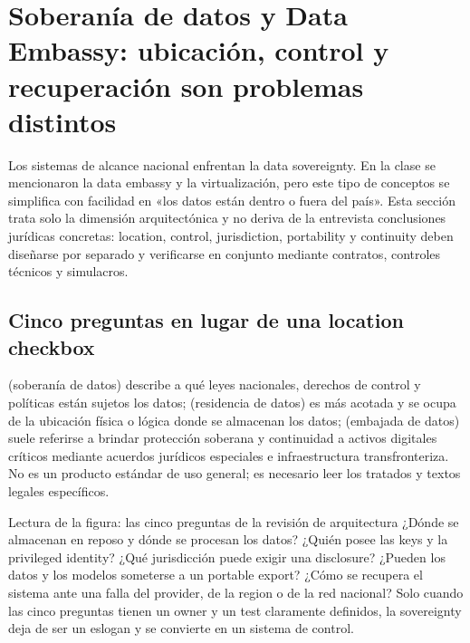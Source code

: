 \section{Soberanía de datos y Data Embassy: ubicación, control y recuperación son problemas distintos}

Los sistemas de alcance nacional enfrentan la data sovereignty. En la clase se mencionaron la data embassy y la virtualización, pero este tipo de conceptos se simplifica con facilidad en «los datos están dentro o fuera del país». Esta sección trata solo la dimensión arquitectónica y no deriva de la entrevista conclusiones jurídicas concretas: location, control, jurisdiction, portability y continuity deben diseñarse por separado y verificarse en conjunto mediante contratos, controles técnicos y simulacros.

\subsection{Cinco preguntas en lugar de una location checkbox}

 (soberanía de datos) describe a qué leyes nacionales, derechos de control y políticas están sujetos los datos;  (residencia de datos) es más acotada y se ocupa de la ubicación física o lógica donde se almacenan los datos;  (embajada de datos) suele referirse a brindar protección soberana y continuidad a activos digitales críticos mediante acuerdos jurídicos especiales e infraestructura transfronteriza. No es un producto estándar de uso general; es necesario leer los tratados y textos legales específicos.


\begin{knowledgebox}{Lectura de la figura: las cinco preguntas de la revisión de arquitectura}
¿Dónde se almacenan en reposo y dónde se procesan los datos? ¿Quién posee las keys y la privileged identity? ¿Qué jurisdicción puede exigir una disclosure? ¿Pueden los datos y los modelos someterse a un portable export? ¿Cómo se recupera el sistema ante una falla del provider, de la region o de la red nacional? Solo cuando las cinco preguntas tienen un owner y un test claramente definidos, la sovereignty deja de ser un eslogan y se convierte en un sistema de control.
\end{knowledgebox}

